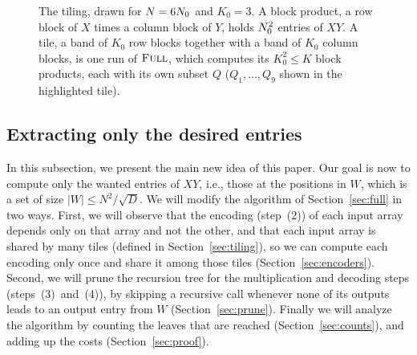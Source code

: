 \begin{figure}[tb]
\centering
{}
\caption{The tiling, drawn for $N=6N_0$ and $K_0=3$. A block product, a row block of $X$ times a column block of $Y$, holds $N_0^2$ entries of $XY$. A tile, a band of $K_0$ row blocks together with a band of $K_0$ column blocks, is one run of $\textnormal{\textsc{Full}}$, which computes its $K_0^2\le K$ block products, each with its own subset $Q$ ($Q_1,\dots,Q_9$ shown in the highlighted tile).}\label{fig:tiling}
\end{figure}

\subsection{Extracting only the desired entries}\label{sec:sparse}

In this subsection, we present the main new idea of this paper. Our goal is now to compute only the wanted entries of $XY$, i.e., those at the positions in $W$, which is a set of size $|W| \leq N^2/\sqrt D$. We will modify the algorithm of Section~\ref{sec:full} in two ways. First, we will observe that the encoding (step~(2)) of each input array depends only on that array and not the other, and that each input array is shared by many tiles (defined in Section~\ref{sec:tiling}), so we can compute each encoding only once and share it among those tiles (Section~\ref{sec:encoders}). Second, we will prune the recursion tree for the multiplication and decoding steps (steps~(3)~and~(4)), by skipping a recursive call whenever none of its outputs leads to an output entry from $W$ (Section~\ref{sec:prune}). Finally we will analyze the algorithm by counting the leaves that are reached (Section~\ref{sec:counts}), and adding up the costs (Section~\ref{sec:proof}).

